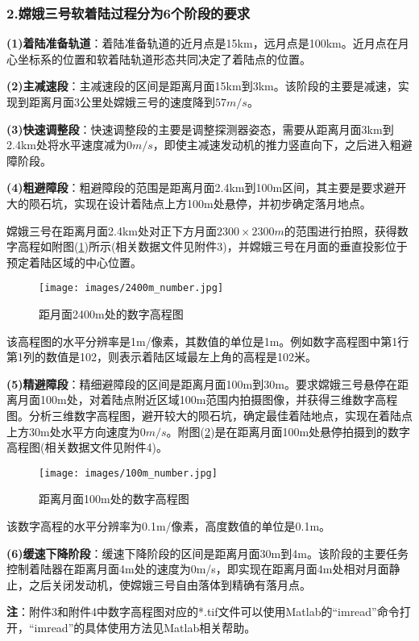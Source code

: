         \subsubsection{2.嫦娥三号软着陆过程分为6个阶段的要求}
            \par
            \textbf{(1)着陆准备轨道}：着陆准备轨道的近月点是15km，远月点是100km。近月点在月心坐标系的位置和软着陆轨道形态共同决定了着陆点的位置。
            \par
            \textbf{(2)主减速段}：主减速段的区间是距离月面15km到3km。该阶段的主要是减速，实现到距离月面3公里处嫦娥三号的速度降到$57m/s$。
            \par
            \textbf{(3)快速调整段}：快速调整段的主要是调整探测器姿态，需要从距离月面3km到 2.4km处将水平速度减为$0m/s$，即使主减速发动机的推力竖直向下，之后进入粗避障阶段。
            \par
            \textbf{(4)粗避障段}：粗避障段的范围是距离月面2.4km到100m区间，其主要是要求避开大的陨石坑，实现在设计着陆点上方100m处悬停，并初步确定落月地点。
            \par
            嫦娥三号在距离月面2.4km处对正下方月面$2300\times 2300m$的范围进行拍照，获得数字高程如附图(\ref{fig:距月面2400m处的数字高程图})所示(相关数据文件见附件3)，并嫦娥三号在月面的垂直投影位于预定着陆区域的中心位置。
            \begin{figure}[H]
            \centering
            \texttt{[image: images/2400m\_number.jpg]}
            \caption{距月面2400m处的数字高程图}
            \label{fig:距月面2400m处的数字高程图}
            \end{figure}
            \par
            该高程图的水平分辨率是1m/像素，其数值的单位是1m。例如数字高程图中第1行第1列的数值是102，则表示着陆区域最左上角的高程是102米。
            \par
            \textbf{(5)精避障段}：精细避障段的区间是距离月面100m到30m。要求嫦娥三号悬停在距离月面100m处，对着陆点附近区域100m范围内拍摄图像，并获得三维数字高程图。分析三维数字高程图，避开较大的陨石坑，确定最佳着陆地点，实现在着陆点上方30m处水平方向速度为$0m/s$。附图(\ref{fig:距离月面100m处的数字高程图})是在距离月面100m处悬停拍摄到的数字高程图(相关数据文件见附件4)。
            \begin{figure}[H]
            \centering
            \texttt{[image: images/100m\_number.jpg]}
            \caption{距离月面100m处的数字高程图}
            \label{fig:距离月面100m处的数字高程图}
            \end{figure}
            \par
            该数字高程的水平分辨率为0.1m/像素，高度数值的单位是0.1m。
            \par
            \textbf{(6)缓速下降阶段}：缓速下降阶段的区间是距离月面30m到4m。该阶段的主要任务控制着陆器在距离月面4m处的速度为0m/s，即实现在距离月面4m处相对月面静止，之后关闭发动机，使嫦娥三号自由落体到精确有落月点。
            \par
            \textbf{注}：附件3和附件4中数字高程图对应的*.tif文件可以使用Matlab的“imread”命令打开，“imread”的具体使用方法见Matlab相关帮助。
